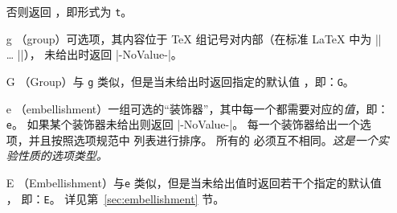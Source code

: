\documentclass{l3doc}
\begin{document}
\begin{itemize}[font=\ttfamily]
否则返回 ，即形式为 \texttt{t}。
\item[g] （group）可选项，其内容位于 \TeX{} 组记号对内部（在标准 \LaTeX{} 中为 |{| \ldots{} |}|），
未给出时返回 |-NoValue-|。
\item[G] （Group）与 \texttt{g} 类似，但是当未给出时返回指定的默认值 ，即：\texttt{G}。
\item[e] （embellishment）一组可选的“装饰器”，其中每一个都需要对应的\emph{值}，即：\texttt{e}。
如果某个装饰器未给出则返回 |-NoValue-|。
每一个装饰器给出一个选项，并且按照选项规范中  列表进行排序。
所有的  必须互不相同。\emph{这是一个实验性质的选项类型。}
\item[E] （Embellishment）与\texttt{e} 类似，但是当未给出值时返回若干个指定的默认值 ，
即：\texttt{E}。
详见第~\ref{sec:embellishment} 节。
 \end{itemize}
\end{document}
